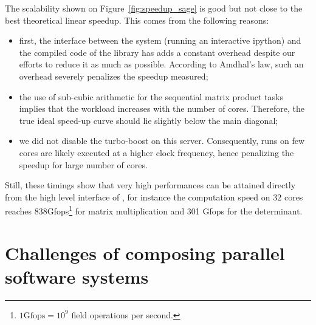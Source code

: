 \documentclass{deliverablereport}
\begin{document}
The scalability shown on Figure~\ref{fig:speedup_sage} is good but not close to the best theoretical linear
speedup. This comes from the following reasons:
\begin{itemize}
\item first, the interface between the system \SageMath (running an interactive ipython) and the compiled code of the
  library has adds a constant overhead despite our efforts to reduce it as much as possible. According to Amdhal's law,
  such an overhead severely penalizes the speedup measured;
\item the use of sub-cubic arithmetic for the sequential matrix product tasks implies that the workload increases with
  the number of cores. Therefore, the true ideal speed-up curve should lie slightly below the main diagonal;
\item we did not disable the turbo-boost on this server. Consequently, runs on few cores are likely executed at a higher
  clock frequency, hence penalizing the speedup for large number of cores.
\end{itemize}

Still, these timings show that very high performances can be attained directly from the high level interface of
\SageMath, for instance the computation speed on 32 cores reaches 838Gfops\footnote{$1\text{Gfops} = 10^9$ field
  operations per second.} for matrix multiplication and 301 Gfops for
the determinant.

\section{Challenges of composing parallel software systems}
\end{document}
